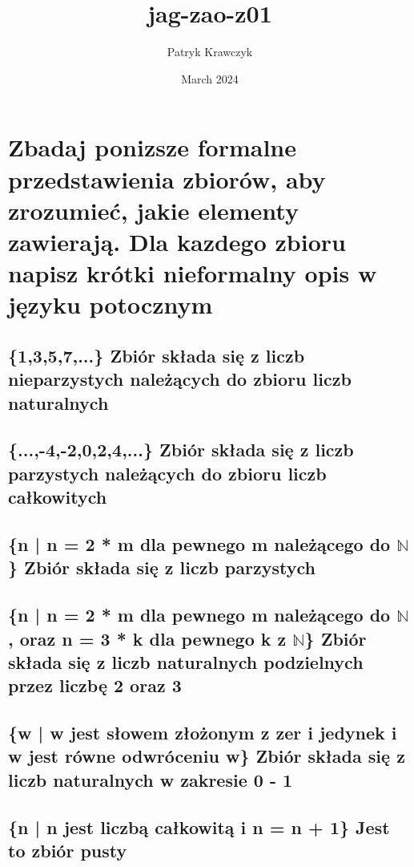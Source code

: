 \documentclass{article}
\title{jag-zao-z01}
\author{Patryk Krawczyk}
\date{March 2024}
\begin{document}
\maketitle

\section{Zbadaj ponizsze formalne przedstawienia zbiorów, aby zrozumieć, jakie elementy zawierają. \newline Dla kazdego zbioru napisz krótki nieformalny opis w języku potocznym}
\subsection{\{1,3,5,7,...\} 
\newline Zbiór składa się z liczb nieparzystych należących do zbioru liczb naturalnych }
\subsection{\{...,-4,-2,0,2,4,...\} 
\newline Zbiór składa się z liczb parzystych należących do zbioru liczb całkowitych }
\subsection{\{n | n = 2 * m dla pewnego m należącego do $\mathbb{N}$ \}
\newline Zbiór składa się z liczb parzystych} 
\subsection{\{n | n = 2 * m dla pewnego m należącego do $\mathbb{N}$, oraz n = 3 * k dla pewnego k z $\mathbb{N}$\}
\newline Zbiór składa się z liczb naturalnych podzielnych przez liczbę 2 oraz 3} 
\subsection{\{w | w jest słowem złożonym z zer i jedynek i w jest równe odwróceniu w\}
\newline Zbiór składa się z liczb naturalnych w zakresie 0 - 1}
\subsection{\{n | n jest liczbą całkowitą i n = n + 1\}
\newline Jest to zbiór pusty}
\end{document}
